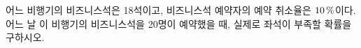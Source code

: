 어느 비행기의 비즈니스석은 18석이고, 비즈니스석 예약자의 예약 취소율은 $10\mkern3mu \%$이다. 어느 날 이 비행기의 비즈니스석을 20명이 예약했을 때, 실제로 좌석이 부족할 확률을 구하시오. 
